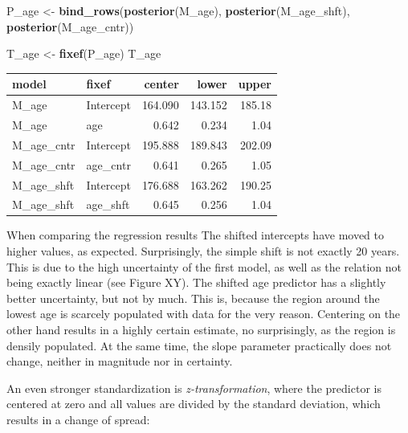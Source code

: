 \documentclass[]{svmono}
\newenvironment{Shaded}{\begin{snugshade}}{\end{snugshade}}
\newcommand{\KeywordTok}[1]{\textcolor[rgb]{0.13,0.29,0.53}{\textbf{#1}}}
\newcommand{\StringTok}[1]{\textcolor[rgb]{0.31,0.60,0.02}{#1}}
\newcommand{\NormalTok}[1]{#1}
\theoremstyle{definition}
\theoremstyle{definition}
\theoremstyle{definition}
\theoremstyle{remark}
\begin{document}
\begin{Shaded}
\begin{Highlighting}[]
\NormalTok{P_age <-}\StringTok{ }
\StringTok{  }\KeywordTok{bind_rows}\NormalTok{(}\KeywordTok{posterior}\NormalTok{(M_age), }
            \KeywordTok{posterior}\NormalTok{(M_age_shft), }
            \KeywordTok{posterior}\NormalTok{(M_age_cntr))}


\NormalTok{T_age <-}\StringTok{ }\KeywordTok{fixef}\NormalTok{(P_age)}
\NormalTok{T_age}
\end{Highlighting}
\end{Shaded}

\begin{longtable}[]{@{}llrrr@{}}
\toprule
model & fixef & center & lower & upper\tabularnewline
\midrule
\endhead
M\_age & Intercept & 164.090 & 143.152 & 185.18\tabularnewline
M\_age & age & 0.642 & 0.234 & 1.04\tabularnewline
M\_age\_cntr & Intercept & 195.888 & 189.843 & 202.09\tabularnewline
M\_age\_cntr & age\_cntr & 0.641 & 0.265 & 1.05\tabularnewline
M\_age\_shft & Intercept & 176.688 & 163.262 & 190.25\tabularnewline
M\_age\_shft & age\_shft & 0.645 & 0.256 & 1.04\tabularnewline
\bottomrule
\end{longtable}

When comparing the regression results The shifted intercepts have moved
to higher values, as expected. Surprisingly, the simple shift is not
exactly 20 years. This is due to the high uncertainty of the first
model, as well as the relation not being exactly linear (see Figure XY).
The shifted age predictor has a slightly better uncertainty, but not by
much. This is, because the region around the lowest age is scarcely
populated with data for the very reason. Centering on the other hand
results in a highly certain estimate, no surprisingly, as the region is
densily populated. At the same time, the slope parameter practically
does not change, neither in magnitude nor in certainty.

An even stronger standardization is \emph{z-transformation}, where the
predictor is centered at zero and all values are divided by the standard
deviation, which results in a change of spread:
\end{document}
